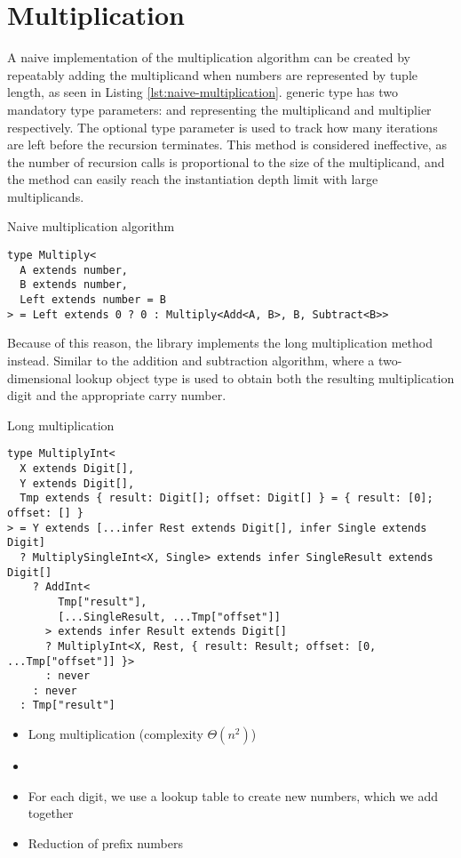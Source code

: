 \section{Multiplication}

A naive implementation of the multiplication algorithm can be created by repeatably adding the multiplicand when numbers are represented by tuple length, as seen in Listing \ref{lst:naive-multiplication}.  generic type has two mandatory type parameters:  and  representing the multiplicand and multiplier respectively. The optional type parameter  is used to track how many iterations are left before the recursion terminates. This method is considered ineffective, as the number of recursion calls is proportional to the size of the multiplicand, and the method can easily reach the instantiation depth limit with large multiplicands.

\begin{listing}[ht]
  \caption{Naive multiplication algorithm}\label{lst:naive-multiplication}
  \begin{verbatim}
type Multiply<
  A extends number,
  B extends number,
  Left extends number = B
> = Left extends 0 ? 0 : Multiply<Add<A, B>, B, Subtract<B>>
\end{verbatim}
\end{listing}

Because of this reason, the library implements the long multiplication method instead. Similar to the addition and subtraction algorithm, where a two-dimensional lookup object type is used to obtain both the resulting multiplication digit and the appropriate carry number. 


\begin{listing}[ht]
\caption{Long multiplication}\label{lst:long-multiplication}
\begin{verbatim}
type MultiplyInt<
  X extends Digit[],
  Y extends Digit[],
  Tmp extends { result: Digit[]; offset: Digit[] } = { result: [0]; offset: [] }
> = Y extends [...infer Rest extends Digit[], infer Single extends Digit]
  ? MultiplySingleInt<X, Single> extends infer SingleResult extends Digit[]
    ? AddInt<
        Tmp["result"],
        [...SingleResult, ...Tmp["offset"]]
      > extends infer Result extends Digit[]
      ? MultiplyInt<X, Rest, { result: Result; offset: [0, ...Tmp["offset"]] }>
      : never
    : never
  : Tmp["result"]
\end{verbatim}
\end{listing}

\begin{itemize}
  \item Long multiplication (complexity $\Theta(n^2)$)
  \item
  \item For each digit, we use a lookup table to create new numbers, which we add together
  \item Reduction of prefix numbers
\end{itemize}
